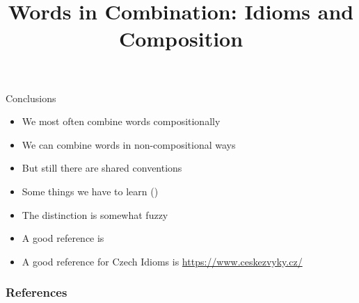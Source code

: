 \documentclass{beamer}
\title[Combinations of Words]{Words in Combination: Idioms and Composition}
\begin{document}
 
\maketitle
 



%
%

\begin{frame}{Conclusions}
  \begin{itemize}
  \item We most often combine words compositionally
  \item We can combine words in non-compositional ways
  \item But still there are shared conventions
  \item Some things we have to learn ()
  \item The distinction is somewhat fuzzy
  \item A good reference is \citet{Sag02a}
  \item A good reference for Czech Idioms is
    \url{https://www.ceskezvyky.cz/}
\end{itemize}
\end{frame}



\begin{frame}[allowframebreaks]
  \frametitle{References}
  
  
\end{frame}
\end{document}
